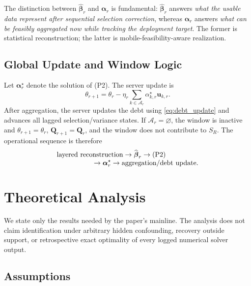 \documentclass[letterpaper,journal]{IEEEtran}
\begin{document}
The distinction between
$\widehat{\boldsymbol\beta}_r$ and $\boldsymbol\alpha_r$ is fundamental:
$\widehat{\boldsymbol\beta}_r$ answers \emph{what the usable data represent
after sequential selection correction}, whereas $\boldsymbol\alpha_r$ answers
\emph{what can be feasibly aggregated now while tracking the deployment
target}.  The former is statistical reconstruction; the latter is
mobile-feasibility-aware realization.

\subsection{Global Update and Window Logic}
\label{subsec:global_update}

Let $\boldsymbol\alpha_r^\star$ denote the solution of (P2).  The server update
is
\begin{equation}
 \theta_{r+1}
 =
 \theta_r
 -
 \eta_r
 \sum_{k\in\mathcal{A}_r}
 \alpha^\star_{k,r}\mathbf{u}_{k,r}.
 \label{eq:server_update}
\end{equation}
After aggregation, the server updates the debt using
\eqref{eq:debt_update} and advances all lagged selection/variance states.  If
$\mathcal{A}_r=\varnothing$, the window is inactive and
$\theta_{r+1}=\theta_r$, $\mathbf{Q}_{r+1}=\mathbf{Q}_r$, and the window does
not contribute to $S_R$.  The operational sequence is therefore
\begin{equation}
\begin{aligned}
 &\text{layered reconstruction}
 \rightarrow
 \widehat{\boldsymbol\beta}_r
 \rightarrow
 \text{(P2)}\\[-1mm]
 &\hspace{18mm}\rightarrow
 \boldsymbol\alpha_r^\star
 \rightarrow
 \text{aggregation/debt update}.
\end{aligned}
 \label{eq:raven_pipeline}
\end{equation}


\section{Theoretical Analysis}
\label{sec:theory}

We state only the results needed by the paper's mainline.  The analysis does not
claim identification under arbitrary hidden confounding, recovery outside
support, or retrospective exact optimality of every logged numerical solver
output.

\subsection{Assumptions}
\label{subsec:assumptions}
\end{document}
